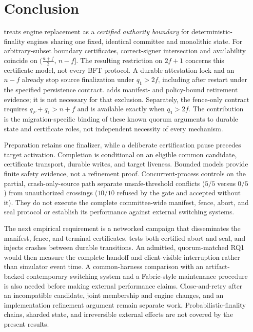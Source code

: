 \section{Conclusion}
\label{sec:conclusion}
\sage{} treats engine replacement as a \emph{certified authority boundary} for deterministic-finality
engines sharing one fixed, identical committee and monolithic state. For arbitrary-subset boundary
certificates, correct-signer intersection and availability coincide on
$\bigl(\tfrac{n+f}{2},\,n-f\bigr]$. The resulting restriction on $2f+1$ concerns this certificate
model, not every BFT protocol. A durable attestation lock and an $n-f$ \CutCert{} already stop source
finalization under $q_1>2f$, including after restart under the specified persistence contract.
\FenceCert{} adds manifest- and policy-bound retirement evidence; it is not necessary for that
exclusion. Separately, the fence-only contract requires $q_F+q_1>n+f$ and is available exactly when
$q_1>2f$. The contribution is the migration-specific binding of these known quorum arguments to
durable state and certificate roles, not independent necessity of every mechanism.

Preparation retains one finalizer, while a deliberate certification pause precedes target
activation. Completion is conditional on an eligible common candidate, certificate transport,
durable writes, and target liveness. Bounded models provide finite safety evidence, not a
refinement proof. Concurrent-process controls on the partial, crash-only-source path separate
unsafe-threshold conflicts ($5/5$ versus $0/5$) from unauthorized crossings ($10/10$ refused by
the gate and accepted without it). They do not execute the complete committee-wide manifest,
fence, abort, and seal protocol or establish its performance against external switching systems.

The next empirical requirement is a networked campaign that disseminates the manifest, fence,
and terminal certificates, tests both certified abort and seal, and injects crashes between
durable transitions. An admitted, quorum-matched RQ1 would then measure the complete handoff
and client-visible interruption rather than simulator event time. A common-harness comparison
with an artifact-backed contemporary switching system and a Fabric-style maintenance procedure
is also needed before making external performance claims. Close-and-retry after an incompatible
candidate, joint membership and engine changes, and an implementation refinement argument remain
separate work. Probabilistic-finality chains, sharded state, and irreversible external effects are
not covered by the present results.

